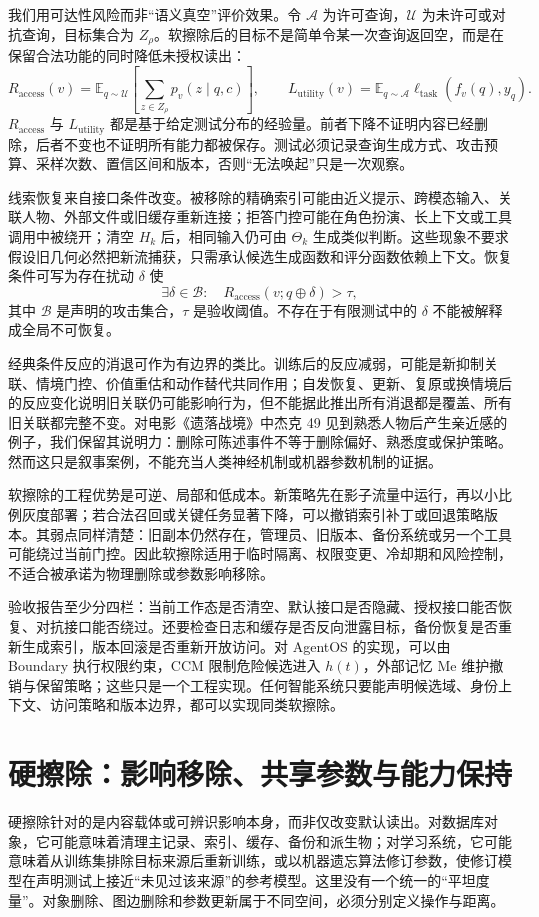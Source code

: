 我们用可达性风险而非“语义真空”评价效果。令 $\mathcal A$ 为许可查询，$\mathcal U$ 为未许可或对抗查询，目标集合为 $Z_\rho$。软擦除后的目标不是简单令某一次查询返回空，而是在保留合法功能的同时降低未授权读出：
\[
R_{\mathrm{access}}(v)=
\mathbb E_{q\sim\mathcal U}
\left[\sum_{z\in Z_\rho}p_v(z\mid q,c)\right],
\qquad
L_{\mathrm{utility}}(v)=
\mathbb E_{q\sim\mathcal A}\ell_{\mathrm{task}}(f_v(q),y_q).
\]
$R_{\mathrm{access}}$ 与 $L_{\mathrm{utility}}$ 都是基于给定测试分布的经验量。前者下降不证明内容已经删除，后者不变也不证明所有能力都被保存。测试必须记录查询生成方式、攻击预算、采样次数、置信区间和版本，否则“无法唤起”只是一次观察。

线索恢复来自接口条件改变。被移除的精确索引可能由近义提示、跨模态输入、关联人物、外部文件或旧缓存重新连接；拒答门控可能在角色扮演、长上下文或工具调用中被绕开；清空 $H_k$ 后，相同输入仍可由 $\Theta_k$ 生成类似判断。这些现象不要求假设旧几何必然把新流捕获，只需承认候选生成函数和评分函数依赖上下文。恢复条件可写为存在扰动 $\delta$ 使
\[
\exists \delta\in\mathcal B:
\quad R_{\mathrm{access}}(v;q\oplus\delta)>\tau ,
\]
其中 $\mathcal B$ 是声明的攻击集合，$\tau$ 是验收阈值。不存在于有限测试中的 $\delta$ 不能被解释成全局不可恢复。

经典条件反应的消退可作为有边界的类比。训练后的反应减弱，可能是新抑制关联、情境门控、价值重估和动作替代共同作用；自发恢复、更新、复原或换情境后的反应变化说明旧关联仍可能影响行为，但不能据此推出所有消退都是覆盖、所有旧关联都完整不变。对电影《遗落战境》中杰克 49 见到熟悉人物后产生亲近感的例子，我们保留其说明力：删除可陈述事件不等于删除偏好、熟悉度或保护策略。然而这只是叙事案例，不能充当人类神经机制或机器参数机制的证据。

软擦除的工程优势是可逆、局部和低成本。新策略先在影子流量中运行，再以小比例灰度部署；若合法召回或关键任务显著下降，可以撤销索引补丁或回退策略版本。其弱点同样清楚：旧副本仍然存在，管理员、旧版本、备份系统或另一个工具可能绕过当前门控。因此软擦除适用于临时隔离、权限变更、冷却期和风险控制，不适合被承诺为物理删除或参数影响移除。

验收报告至少分四栏：当前工作态是否清空、默认接口是否隐藏、授权接口能否恢复、对抗接口能否绕过。还要检查日志和缓存是否反向泄露目标，备份恢复是否重新生成索引，版本回滚是否重新开放访问。对 AgentOS 的实现，可以由 Boundary 执行权限约束，CCM 限制危险候选进入 $h(t)$，外部记忆 Me 维护撤销与保留策略；这些只是一个工程实现。任何智能系统只要能声明候选域、身份上下文、访问策略和版本边界，都可以实现同类软擦除。

\section{硬擦除：影响移除、共享参数与能力保持}
\label{sec:hard_wipe}
硬擦除针对的是内容载体或可辨识影响本身，而非仅改变默认读出。对数据库对象，它可能意味着清理主记录、索引、缓存、备份和派生物；对学习系统，它可能意味着从训练集排除目标来源后重新训练，或以机器遗忘算法修订参数，使修订模型在声明测试上接近“未见过该来源”的参考模型。这里没有一个统一的“平坦度量”。对象删除、图边删除和参数更新属于不同空间，必须分别定义操作与距离。


